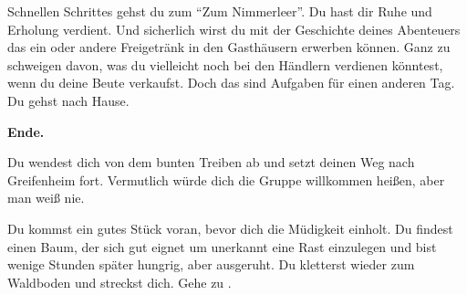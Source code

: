 Schnellen Schrittes gehst du zum ``Zum Nimmerleer''. Du hast dir Ruhe und Erholung verdient. Und sicherlich wirst du mit der Geschichte deines Abenteuers das ein oder andere Freigetränk in den Gasthäusern erwerben können. Ganz zu schweigen davon, was du vielleicht noch bei den Händlern verdienen könntest, wenn du deine Beute verkaufst. Doch das sind Aufgaben für einen anderen Tag. Du gehst nach Hause.

\textbf{Ende.}


Du wendest dich von dem bunten Treiben ab und setzt deinen Weg nach Greifenheim fort. Vermutlich würde dich die Gruppe willkommen heißen, aber man weiß nie.

Du kommst ein gutes Stück voran, bevor dich die Müdigkeit einholt. Du findest einen Baum, der sich gut eignet um unerkannt eine Rast einzulegen und bist wenige Stunden später hungrig, aber ausgeruht.
Du kletterst wieder zum Waldboden und streckst dich. Gehe zu .
